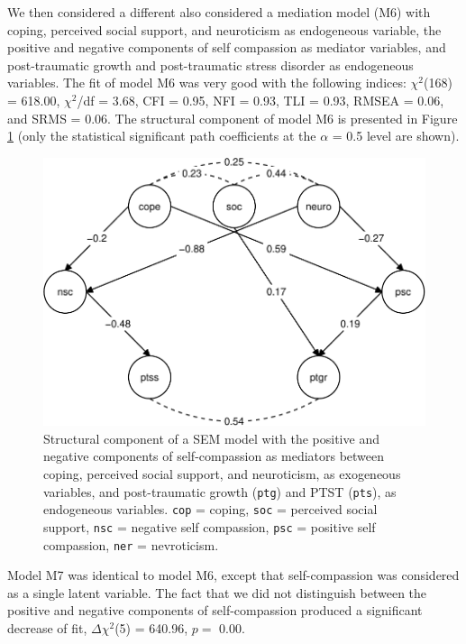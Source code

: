 \documentclass[
  english,
  man,floatsintext]{apa7}
\begin{document}
We then considered a different also considered a mediation model (M6) with coping, perceived social support, and neuroticism as endogeneous variable, the positive and negative components of self compassion as mediator variables, and post-traumatic growth and post-traumatic stress disorder as endogeneous variables.
The fit of model M6 was very good with the following indices: \(\chi^2\)(168) = 618.00, \(\chi^2\)/df = 3.68, CFI = 0.95, NFI = 0.93, TLI = 0.93, RMSEA = 0.06, and SRMS = 0.06.
The structural component of model M6 is presented in Figure \ref{fig:mediation-model} (only the statistical significant path coefficients at the \(\alpha\) = 0.5 level are shown).

\begin{figure}
\centering
\includegraphics{self_compassion_files/figure-latex/mediation-model-1.pdf}
\caption{\label{fig:mediation-model}Structural component of a SEM model with the positive and negative components of self-compassion as mediators between coping, perceived social support, and neuroticism, as exogeneous variables, and post-traumatic growth (\texttt{ptg}) and PTST (\texttt{pts}), as endogeneous variables. \texttt{cop} = coping, \texttt{soc} = perceived social support, \texttt{nsc} = negative self compassion, \texttt{psc} = positive self compassion, \texttt{ner} = nevroticism.}
\end{figure}

Model M7 was identical to model M6, except that self-compassion was considered as a single latent variable.
The fact that we did not distinguish between the positive and negative components of self-compassion produced a significant decrease of fit, \(\Delta \chi^2\)(5) = 640.96, \(p =\) 0.00.
\end{document}
